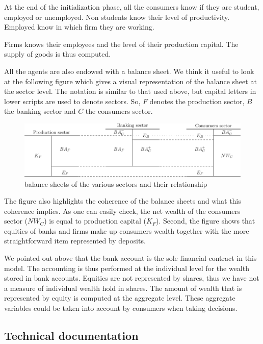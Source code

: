 \documentclass{book}
\begin{document}
At the end of the initialization phase, all the consumers know if they are student, employed or unemployed. Non students know their level of productivity. Employed know in which firm they are working.

Firms knows their employees and the level of their production capital. The supply of goods is thus computed.

All the agents are also endowed with a balance sheet. We think it useful to look at the following figure which gives a visual representation of the balance sheet at the sector level. 
The notation is similar to that used above, but capital letters in lower scripts are used to denote sectors. So, $F$ denotes the production sector, $B$ the banking sector and $C$ the consumers sector. 

\begin{figure}[htp]
	\centering
\includegraphics[scale=0.7]{manual_balances-0.pdf}
	\caption{balance sheets of the various sectors and their relationship}
	\label{fig:balances}
\end{figure}

The figure also highlights the coherence of the balance sheets and what this coherence implies. As one can easily check, the net wealth of the consumers sector ($NW_C$) is equal to production capital ($K_F$). Second, the figure shows that equities of banks and firms make up consumers wealth together with the more straightforward item represented by deposits. 

We pointed out above that the bank account is the sole financial contract in this model. The accounting is thus performed at the individual level for the wealth stored in bank accounts. Equities are not represented by shares, thus we have not a measure of individual wealth hold in shares. The amount of wealth that is represented by equity is computed at the aggregate level. These aggregate variables could be taken into account by consumers when taking decisions.   

\subsection{Technical documentation}
\end{document}
